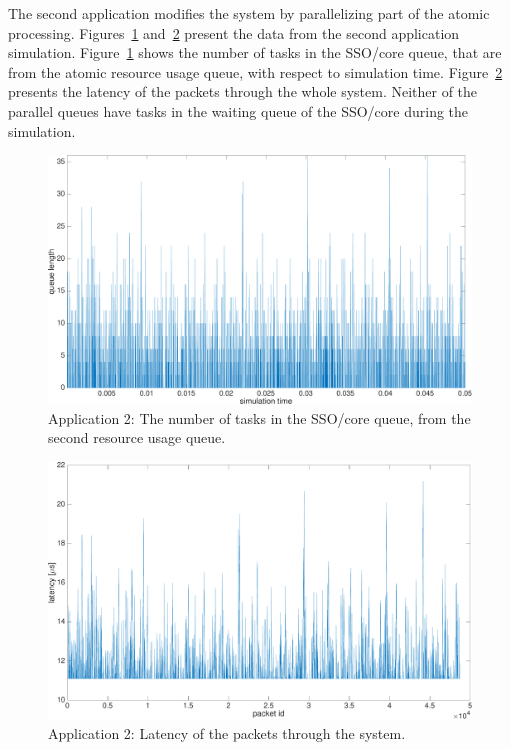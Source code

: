 The second application modifies the system by parallelizing part of the atomic processing. Figures~\ref{fig:app2-queue2} and~\ref{fig:app2-latency} present the data from the second application simulation. Figure~\ref{fig:app2-queue2} shows the number of tasks in the SSO/core queue, that are from the atomic resource usage queue, with respect to simulation time. Figure~\ref{fig:app2-latency} presents the latency of the packets through the whole system. Neither of the parallel queues have tasks in the waiting queue of the SSO/core during the simulation.

\begin{figure}[]
  \begin{center}
    \includegraphics[width=\textwidth]{images/experiment/app2-queue2.pdf}
    \caption{Application 2: The number of tasks in the SSO/core queue, from the second resource usage queue.}
    \label{fig:app2-queue2}
  \end{center}
\end{figure}

\begin{figure}[]
  \begin{center}
    \includegraphics[width=\textwidth]{images/experiment/app2-latency.pdf}
    \caption{Application 2: Latency of the packets through the system.}
    \label{fig:app2-latency}
  \end{center}
\end{figure}

